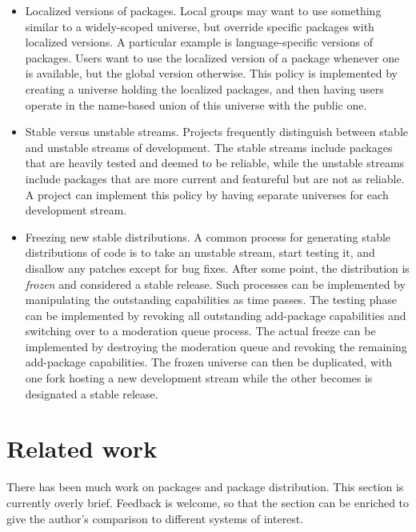 \documentclass{article}
\begin{document}
\begin{itemize}
\item Localized versions of packages.  Local groups may want to use
      something similar to a widely-scoped universe, but override
      specific packages with localized versions.  A particular example
      is language-specific versions of packages.  Users want to use
      the localized version of a package whenever one is available,
      but the global version otherwise.  This policy is implemented by
      creating a universe holding the localized packages, and then
      having users operate in the name-based union of this universe
      with the public one.

\item Stable versus unstable streams.  Projects frequently distinguish
      between stable and unstable streams of development.  The stable
      streams include packages that are heavily tested and deemed to
      be reliable, while the unstable streams include packages that
      are more current and featureful but are not as reliable.  A
      project can implement this policy by having separate universes
      for each development stream.  

\item Freezing new stable distributions.  A common process for
      generating stable distributions of code is to take an unstable
      stream, start testing it, and disallow any patches except for
      bug fixes.
      After some
      point, the distribution is \emph{frozen} and considered a stable
      release.  Such processes can be implemented by manipulating the
      outstanding capabilities as time passes.  The testing phase can
      be implemented by revoking all outstanding add-package
      capabilities and switching over to a moderation queue process.  The
      actual freeze can be implemented by destroying the moderation
      queue and revoking the remaining add-package capabilities.  The
      frozen universe can then be duplicated, with one fork hosting
      a new development stream while the other becomes is designated
      a stable release.
\end{itemize}



\section{Related work}
There has been much work on packages and package distribution.  This
section is currently overly brief.  Feedback is welcome, so that the
section can be enriched to give the author's comparison to different
systems of interest.
\end{document}
